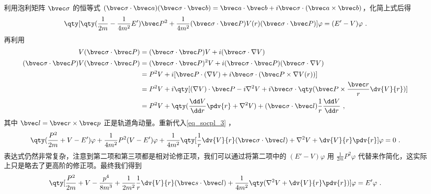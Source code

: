 利用泡利矩阵 $\bvec \sigma$ 的恒等式  $(\bvec \sigma\cdot \bvec a)(\bvec \sigma\cdot \bvec b)=\bvec a\cdot \bvec b+i\bvec \sigma\cdot (\bvec a\times \bvec b)$，化简上式后得
\begin{equation}\label{eq_socpl_3}
\qty[\qty(\frac{1}{2m}-\frac{1}{4m^2}E')\bvec P^2+\frac{1}{4m^2}(\bvec \sigma\cdot \bvec P)V(r)(\bvec \sigma\cdot \bvec P)]\varphi=(E'-V)\varphi~.
\end{equation}
再利用
\begin{equation}
\begin{aligned}
V(\bvec \sigma\cdot \bvec P)&=(\bvec \sigma\cdot \bvec P)V+i (\bvec \sigma\cdot \nabla V)\\
(\bvec \sigma\cdot \bvec P)V(\bvec \sigma\cdot \bvec P)&=(\bvec \sigma\cdot \bvec P)^2 V+i (\bvec \sigma\cdot \bvec P)(\bvec \sigma\cdot \nabla V)\\
&=P^2 V+i [\bvec P\cdot (\nabla V)+i\bvec \sigma \cdot (\bvec P\times \nabla V(r))]\\
&=P^2V+i\qty[(\nabla V)\cdot \bvec P-i\nabla^2 V+i\bvec \sigma\cdot\qty(\bvec P\times \frac{\bvec r}{r}\dv{V}{r})]\\
&=P^2V+\qty(\frac{\dd V}{\dd r}\pdv{r} + \nabla^2 V)+(\bvec \sigma\cdot \bvec l)\frac{1}{r}\frac{\dd V}{\dd r}~,
\end{aligned}
\end{equation}
其中 $\bvec l=\bvec r\times \bvec p$ 正是轨道角动量。重新代入\autoref{eq_socpl_3} ，
\begin{equation}
\qty(\frac{P^2}{2m}+V-E')\varphi+\frac{1}{4m^2}P^2(V-E')\varphi + \frac{1}{4m^2}\qty[\frac{1}{r}\dv{V}{r}(\bvec \sigma\cdot\bvec l)+\nabla^2 V+\dv{V}{r}\pdv{r}]\varphi = 0~.
\end{equation}
表达式仍然非常复杂，注意到第二项和第三项都是相对论修正项，我们可以通过将第二项中的 $(E'-V)\varphi$ 用 $\frac{1}{2m}P^2\varphi$ 代替来作简化，这实际上只是略去了更高阶的修正项。最终我们得到
\begin{equation}
\qty[\frac{P^2}{2m}+V-\frac{p^4}{8m^3}+\frac{1}{2m^2}\frac{1}{r}\dv{V}{r}(\bvec s\cdot \bvec l)+\frac{1}{4m^2}\qty(\nabla^2 V+\dv{V}{r}\pdv{r})]\varphi = E'\varphi~.
\end{equation}

